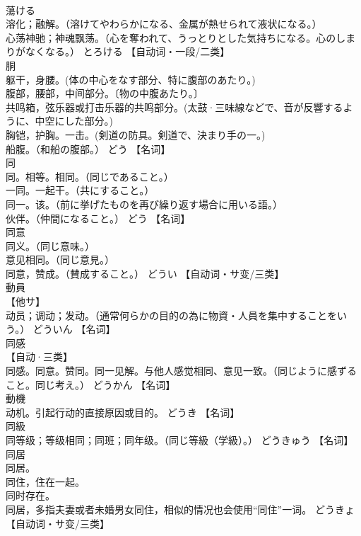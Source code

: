 \documentclass[8pt]{extreport}
\begin{document}
\begin{CJK}{UTF8}{min}
\\	蕩ける	
\\	溶化；融解。（溶けてやわらかになる、金属が熱せられて液状になる。） 
\\	心荡神驰；神魂飘荡。（心を奪われて、うっとりとした気持ちになる。心のしまりがなくなる。）	とろける		【自动词・一段/二类】
\\	胴	
\\	躯干，身腰。(体の中心をなす部分、特に腹部のあたり。) 
\\	腹部，腰部，中间部分。〔物の中腹あたり。〕 
\\	共鸣箱，弦乐器或打击乐器的共鸣部分。(太鼓·三味線などで、音が反響するように、中空にした部分。) 
\\	胸铠，护胸。一击。(剣道の防具。剣道で、決まり手の一。) 
\\	船腹。（和船の腹部。）	どう		【名词】
\\	同	
\\	同。相等。相同。（同じであること。） 
\\	一同。一起干。（共にすること。） 
\\	同一。该。（前に挙げたものを再び繰り返す場合に用いる語。） 
\\	伙伴。（仲間になること。）	どう		【名词】
\\	同意	
\\	同义。（同じ意味。） 
\\	意见相同。（同じ意見。） 
\\	同意，赞成。（賛成すること。）	どうい		【自动词・サ变/三类】
\\	動員	
\\	【他サ】 
\\	动员；调动；发动。（通常何らかの目的の為に物資・人員を集中することをいう。）	どういん		【名词】
\\	同感	
\\	【自动·三类】 
\\	同感。同意。赞同。同一见解。与他人感觉相同、意见一致。（同じように感ずること。同じ考え。）	どうかん		【名词】
\\	動機	
\\	动机。引起行动的直接原因或目的。	どうき		【名词】
\\	同級	
\\	同等级；等级相同；同班；同年级。（同じ等級（学級）。）	どうきゅう		【名词】
\\	同居	
\\	同居。 
\\	同住，住在一起。 
\\	同时存在。 
\\	同居，多指夫妻或者未婚男女同住，相似的情况也会使用“同住”一词。	どうきょ		【自动词・サ变/三类】

\end{CJK}
\end{document}

